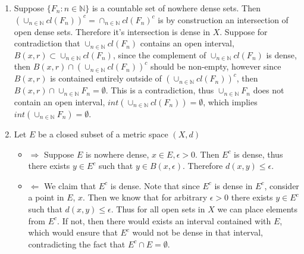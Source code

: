 \documentclass[12pt, letterpaper]{article}
\newcommand{\N}{\mathbb{N}}
\begin{document}
\begin{enumerate}
	\item Suppose $\{F_n: n \in \N \}$ is a countable set of nowhere dense sets.  Then $(\cup_{n \in \N} cl(F_n))^c = 
	\cap_{n \in \N} cl(F_n)^c$ is by construction an intersection of open dense sets.  Therefore it's intersection is dense 
	in $X$.  Suppose for contradiction that $\cup_{n \in \N} cl(F_n)$ contains an open interval, $B(x,r) \subset \cup_{n \in \N} cl(F_n)$, since the complement of $\cup_{n \in \N} cl(F_n)$ is dense, then $B(x,r) \cap (\cup_{n \in \N} cl(F_n))^c$ should be 
	non-empty, however since $B(x,r)$ is contained entirely outside of $(\cup_{n \in \N} cl(F_n))^c$, then $B(x,r) \cap \cup_{n \in \N} F_n = \emptyset$.  This is a contradiction, thus $\cup_{n \in \N} F_n$ does not contain an open interval,
	$int(\cup_{n \in \N} cl(F_n)) = \emptyset$, which implies $int(\cup_{n \in \N} F_n) = \emptyset$.
	\item Let $E$ be a closed subset of a metric space $(X,d)$
	\begin{itemize}
		\item $\Rightarrow$ Suppose $E$ is nowhere dense, $x \in E, \epsilon > 0$.  Then $E^c$ is dense, thus there 
		exists $y \in E^c$ such that $y \in B(x,\epsilon)$.  Therefore $d(x,y) \leq \epsilon$.
		\item $\Leftarrow$ We claim that $E^c$ is dense.  Note that since $E^c$ is dense in $E^c$, consider a point in 
		$E$, $x$.  Then we know that for arbitrary $\epsilon > 0$ there exists $y \in E^c$ such that $d(x,y) \leq \epsilon$.  Thus for all open sets in $X$ we can place elements from $E^c$.  If not, then there would exists an interval
		contained with $E$, which would ensure that $E^c$ would not be dense in that interval, contradicting the fact 
		that $E^c \cap E = \emptyset$.  
		

\end{itemize}
\end{enumerate}
\end{document}
